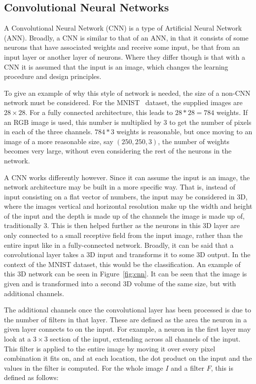\subsection{Convolutional Neural Networks}

A Convolutional Neural Network (CNN) is a type of Artificial Neural Network
(ANN). Broadly, a CNN is similar to that of an ANN, in that it consists of some
neurons that have associated weights and receive some input, be that from an
input layer or another layer of neurons. Where they differ though is that with a
CNN it is assumed that the input is an image, which changes the learning
procedure and design principles.

To give an example of why this style of network is needed, the size of a non-CNN
network must be considered. For the MNIST~\cite{lecun2010mnist} dataset, the
supplied images are $28 \times 28$. For a fully connected architecture, this
leads to $28 * 28 = 784$ weights. If an RGB image is used, this number is
multiplied by 3 to get the number of pixels in each of the three channels. $784
* 3$ weights is reasonable, but once moving to an image of a more reasonable
size, say $(250, 250, 3)$, the number of weights becomes very large, without
even considering the rest of the neurons in the network.

A CNN works differently however. Since it can assume the input is an image, the
network architecture may be built in a more specific way. That is, instead of
input consisting on a flat vector of numbers, the input may be considered in 3D,
where the images vertical and horizontal resolution make up the width and height
of the input and the depth is made up of the channels the image is made up of,
traditionally 3. This is then helped further as the neurons in this 3D layer are
only connected to a small receptive field from the input image, rather than the
entire input like in a fully-connected network. Broadly, it can be said that a
convolutional layer takes a 3D input and transforms it to some 3D output. In the
context of the MNIST dataset, this would be the classification. An example of
this 3D network can be seen in Figure~\ref{fig:cnn}. It can be seen that the
image is given and is transformed into a second 3D volume of the same size, but
with additional channels.

The additional channels once the convolutional layer has been processed is due
to the number of filters in that layer. These are defined as the area the neuron
in a given layer connects to on the input. For example, a neuron in the first
layer may look at a $3 \times 3$ section of the input, extending across all
channels of the input. This filter is applied to the entire image by moving it
over every pixel combination it fits on, and at each location, the dot product
on the input and the values in the filter is computed. For the whole image $I$
and a filter $F$, this is defined as follows:

